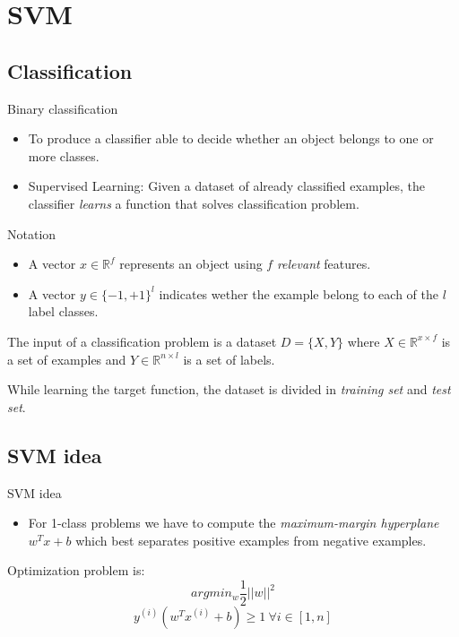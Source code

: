 \section{SVM}
\subsection{Classification}
\begin{frame}{Binary classification}
	\begin{itemize}\setlength\itemsep{1em}
		\item[Goal:] To produce a classifier able to decide whether an object belongs to one or more classes.
		\item[Idea:] Supervised Learning: Given a dataset of already classified examples, the classifier \textit{learns} a function that solves classification problem.
	\end{itemize}
\end{frame}

\begin{frame}{Notation}
	\begin{itemize}\setlength\itemsep{1em}
		\item A vector $x \in \mathbb{R}^f$ represents an object using $f$ \textit{relevant} features.
		\item A vector $y \in \{-1 , +1\}^l$ indicates wether the example belong to each of the $l$ label classes.
	\end{itemize}
	The input of a classification problem is a dataset $D = \{X, Y\}$ where $X \in \mathbb{R}^{x\times f}$ is a set of examples and $Y \in \mathbb{R}^{n\times l}$ is a set of labels.
	
	While learning the target function, the dataset is divided in \textit{training set} and \textit{test set}.
\end{frame}

\subsection{SVM idea}

\begin{frame}{SVM idea}
	\begin{itemize}\setlength\itemsep{1em}
		\item For 1-class problems we have to compute the \textit{maximum-margin hyperplane} $w^Tx + b$ which best separates positive examples from negative examples.
	\end{itemize}
	Optimization problem is:
	$$arg min_w \frac{1}{2} ||w||^2$$
	$$y^{(i)} (w^T x^{(i)} + b) \geq 1 \ \forall i \in [1, n]$$
\end{frame}

